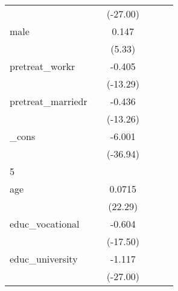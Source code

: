 {\begin{tabular}{l*{5}{c}}
            &                     &    (-27.00)         &                     &                     &                     \\
[1em]
male        &                     &       0.147\sym{***}&                     &                     &                     \\
            &                     &      (5.33)         &                     &                     &                     \\
[1em]
pretreat\_workr&                     &      -0.405\sym{***}&                     &                     &                     \\
            &                     &    (-13.29)         &                     &                     &                     \\
[1em]
pretreat\_marriedr&                     &      -0.436\sym{***}&                     &                     &                     \\
            &                     &    (-13.26)         &                     &                     &                     \\
[1em]
\_cons      &                     &      -6.001\sym{***}&                     &                     &                     \\
            &                     &    (-36.94)         &                     &                     &                     \\
\hline
5           &                     &                     &                     &                     &                     \\
age         &                     &      0.0715\sym{***}&                     &                     &                     \\
            &                     &     (22.29)         &                     &                     &                     \\
[1em]
educ\_vocational&                     &      -0.604\sym{***}&                     &                     &                     \\
            &                     &    (-17.50)         &                     &                     &                     \\
[1em]
educ\_university&                     &      -1.117\sym{***}&                     &                     &                     \\
            &                     &    (-27.00)         &                     &                     &                     \\

\end{tabular}}
